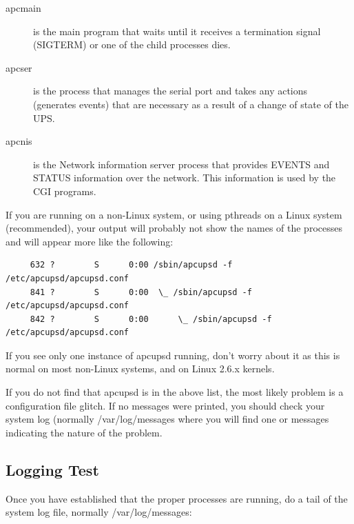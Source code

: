 {\begin{description}

\item [apcmain]
   is the main program that waits until it receives a termination signal
(SIGTERM) or one of the child processes dies.  

\item [apcser]
   is the process that manages the serial port and takes any actions (generates
events) that are necessary as a result of a change of state of the UPS.  

\item [apcnis]
   is the Network information server process that provides EVENTS and STATUS
information over the network. This information is used by the CGI programs. 
\end{description}

If you are running on a non-Linux system, or using pthreads on a Linux system
(recommended), your output will probably not show the names of the processes
and will appear more like the following: 

\footnotesize
\begin{verbatim}
     632 ?        S      0:00 /sbin/apcupsd -f /etc/apcupsd/apcupsd.conf
     841 ?        S      0:00  \_ /sbin/apcupsd -f /etc/apcupsd/apcupsd.conf
     842 ?        S      0:00      \_ /sbin/apcupsd -f /etc/apcupsd/apcupsd.conf
\end{verbatim}
\normalsize

If you see only one instance of apcupsd running, don't worry about it as this
is normal on most non-Linux systems, and on Linux 2.6.x kernels.  

If you do not find that apcupsd is in the above list, the most likely problem
is a configuration file glitch.  If no messages were printed, you should check
your system log (normally /var/log/messages where you will find one or
messages indicating the nature of the problem. 

\label{Logging-Test}

\subsection*{Logging Test}

\label{index-Testing_002c-Logging-87}
\label{index-Logging_002c-Testing-88}
Once you have established that the proper processes are running, do a tail of
the system log file, normally /var/log/messages: 

}

